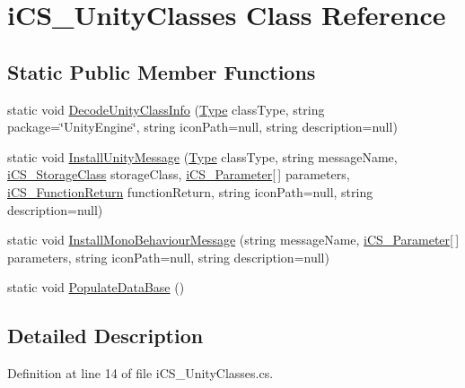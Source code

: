 \hypertarget{classi_c_s___unity_classes}{\section{i\+C\+S\+\_\+\+Unity\+Classes Class Reference}
\label{classi_c_s___unity_classes}
}
\subsection*{Static Public Member Functions}
\begin{DoxyCompactItemize}
\item 
static void \hyperlink{classi_c_s___unity_classes_aacfeafed32186048d7d265babcda341a}{Decode\+Unity\+Class\+Info} (\hyperlink{i_c_s___object_type_enum_8cs_ae6c3dd6d8597380b56d94908eb431547aa1fa27779242b4902f7ae3bdd5c6d508}{Type} class\+Type, string package=\char`\"{}Unity\+Engine\char`\"{}, string icon\+Path=null, string description=null)
\item 
static void \hyperlink{classi_c_s___unity_classes_aabcb44b5d861a5c7631513ab7c4e414f}{Install\+Unity\+Message} (\hyperlink{i_c_s___object_type_enum_8cs_ae6c3dd6d8597380b56d94908eb431547aa1fa27779242b4902f7ae3bdd5c6d508}{Type} class\+Type, string message\+Name, \hyperlink{i_c_s___storage_class_8cs_a4e1bb1da155050e4b0d0118f813194aa}{i\+C\+S\+\_\+\+Storage\+Class} storage\+Class, \hyperlink{classi_c_s___parameter}{i\+C\+S\+\_\+\+Parameter}\mbox{[}$\,$\mbox{]} parameters, \hyperlink{classi_c_s___function_return}{i\+C\+S\+\_\+\+Function\+Return} function\+Return, string icon\+Path=null, string description=null)
\item 
static void \hyperlink{classi_c_s___unity_classes_a4924ba56a58348733a3e6e0c5ce41e55}{Install\+Mono\+Behaviour\+Message} (string message\+Name, \hyperlink{classi_c_s___parameter}{i\+C\+S\+\_\+\+Parameter}\mbox{[}$\,$\mbox{]} parameters, string icon\+Path=null, string description=null)
\item 
static void \hyperlink{classi_c_s___unity_classes_a8997a52748ced58d6d07f5c819f13216}{Populate\+Data\+Base} ()
\end{DoxyCompactItemize}


\subsection{Detailed Description}


Definition at line 14 of file i\+C\+S\+\_\+\+Unity\+Classes.\+cs.



